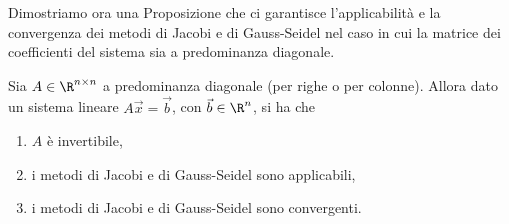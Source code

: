 Dimostriamo ora una Proposizione che ci garantisce l'applicabilità e la convergenza dei metodi di Jacobi e di Gauss-Seidel nel caso in cui la matrice dei coefficienti del sistema sia a predominanza diagonale.

\begin{proposition}
    {}{}
    Sia $A \in \Mat{\R, n, n}$ a predominanza diagonale (per righe o per colonne). Allora dato un sistema lineare $A\vec x = \vec b$, con $\vec b \in \R^n$, si ha che \begin{enumerate}[(1)]
        \item $A$ è invertibile,
        \item i metodi di Jacobi e di Gauss-Seidel sono applicabili,
        \item i metodi di Jacobi e di Gauss-Seidel sono convergenti.
    \end{enumerate}
\end{proposition}
